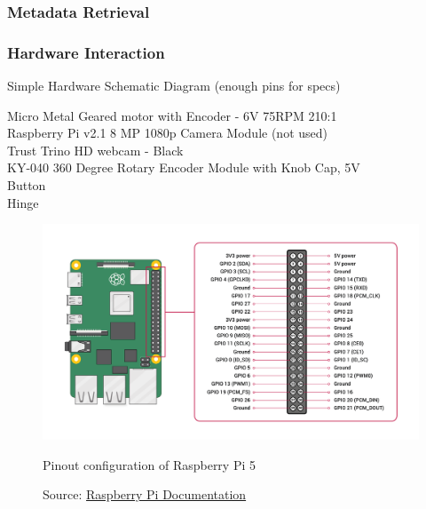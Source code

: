             \subsubsection{Metadata Retrieval}
          
            \subsubsection{Hardware Interaction}
    
                \begin{temp}
                    Simple Hardware Schematic Diagram (enough pins for specs)
    
                    Micro Metal Geared motor with Encoder - 6V 75RPM 210:1 \\ %
                    Raspberry Pi v2.1 8 MP 1080p Camera Module (not used) \\ %
                    Trust Trino HD webcam - Black \\ %
                    KY-040 360 Degree Rotary Encoder Module with Knob Cap, 5V  \\ %
                    Button \\
                    Hinge
                \end{temp}
    
                \begin{figure}[htbp]
                    \centering
                    \includegraphics[width=\linewidth]{images/raspberry-pi-5-pinout.png}
                    \caption{Pinout configuration of Raspberry Pi 5}
                    \label{fig:RPi5Pinout}
                    \caption*{Source: \href{https://www.raspberrypi.com/documentation/computers/raspberry-pi.html#gpio}{Raspberry Pi Documentation}}
                \end{figure}
        
